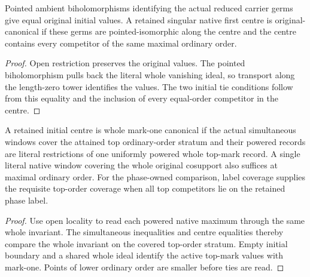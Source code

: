 \begin{theorem}
\label{hir:g8-initial-tie-germ-symmetry}
\leanok
Pointed ambient biholomorphisms identifying the actual reduced
carrier germs give equal original initial values. A retained
singular native first centre is original-canonical if these germs
are pointed-isomorphic along the centre and the centre contains
every competitor of the same maximal ordinary order.
\end{theorem}
\begin{proof}
Open restriction preserves the original values. The pointed
biholomorphism pulls back the literal whole vanishing ideal,
so transport along the length-zero tower identifies the values.
The two initial tie conditions follow from this equality and
the inclusion of every equal-order competitor in the centre.
\end{proof}

\begin{theorem}
\label{hir:g8-initial-uniform-top-cover}
\leanok
A retained initial centre is whole mark-one canonical if the
actual simultaneous windows cover the attained top ordinary-order
stratum and their powered records are literal restrictions of one
uniformly powered whole top-mark record. A single literal native
window covering the whole original cosupport also suffices at
maximal ordinary order. For the phase-owned comparison, label
coverage supplies the requisite top-order coverage when all top
competitors lie on the retained phase label.
\end{theorem}
\begin{proof}
Use open locality to read each powered native maximum through
the same whole invariant. The simultaneous inequalities and
centre equalities thereby compare the whole invariant on the
covered top-order stratum. Empty initial boundary and a shared
whole ideal identify the active top-mark values with mark-one.
Points of lower ordinary order are smaller before ties are read.
\end{proof}

